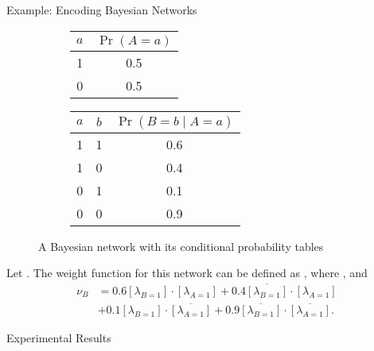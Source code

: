 \documentclass{beamer}
\begin{document}
\begin{frame}{Example: Encoding Bayesian Networks}
  \begin{figure}
    \begin{subfigure}{0.2\textwidth}
      \centering
    \end{subfigure}%
    \begin{subfigure}{0.8\textwidth}
      \centering
      \begin{tabular}[t]{cc}
        \toprule
        $a$ & $\Pr(A = a)$ \\
        \midrule
        1 & 0.5 \\
        0 & 0.5 \\
        \bottomrule
      \end{tabular}
      \begin{tabular}[t]{ccc}
        \toprule
        $a$ & $b$ & $\Pr(B = b \mid A = a)$ \\
        \midrule
        1 & 1 & 0.6 \\
        1 & 0 & 0.4 \\
        0 & 1 & 0.1 \\
        0 & 0 & 0.9 \\
        \bottomrule
      \end{tabular}
    \end{subfigure}
    \caption{A Bayesian network with its conditional probability tables}
  \end{figure}
  \pause
  Let . The weight function
   for this network can be
  defined as , where
  , and
  \begin{align*}
    \nu_B &= 0.6[\lambda_{B=1}] \cdot [\lambda_{A=1}] + 0.4\overline{[\lambda_{B=1}]} \cdot [\lambda_{A=1}] \\
          &+ 0.1[\lambda_{B=1}] \cdot \overline{[\lambda_{A=1}]} + 0.9\overline{[\lambda_{B=1}]} \cdot \overline{[\lambda_{A=1}]}.
  \end{align*}
\end{frame}

\begin{frame}{Experimental Results}
  \centering
  \scalebox{0.8}{}
  \vfill
  \centering
  \scalebox{0.6}{}
\end{frame}
\end{document}
